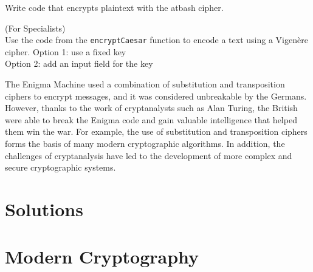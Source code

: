\documentclass[11pt,a4paper]{report}
\begin{document}
\begin{ex}
Write code that encrypts plaintext with the atbash cipher. 
\end{ex}

\begin{ex}
(For Specialists) \\
Use the code from the \verb|encryptCaesar| function to encode a text using a Vigenère cipher.
Option 1: use a fixed key \\
Option 2: add an input field for the key
\end{ex}



%
The Enigma Machine used a combination of substitution and transposition ciphers to encrypt messages, and it was considered unbreakable by the Germans.
However, thanks to the work of cryptanalysts such as Alan Turing, the British were able to break the Enigma code and gain valuable intelligence that helped them win the war.
%
For example, the use of substitution and transposition ciphers forms the basis of many modern cryptographic algorithms.
In addition, the challenges of cryptanalysis have led to the development of more complex and secure cryptographic systems.

\newpage
\section{Solutions}

\printcursols

\newpage

\section{Modern Cryptography}
\end{document}
